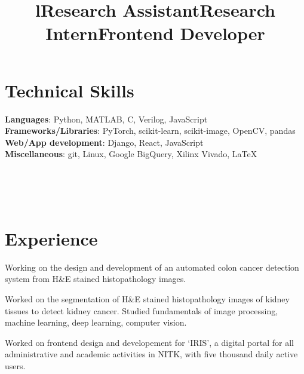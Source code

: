 \documentclass[margin]{res}
\begin{document}
\begin{resume}
    \section{Technical Skills}
      \textbf{Languages}: Python, MATLAB, C, Verilog, JavaScript
      \\
      \textbf{Frameworks/Libraries}: PyTorch, scikit-learn, scikit-image, OpenCV, pandas
      \\
      \textbf{Web/App development}: Django, React, JavaScript
      \\
      \textbf{Miscellaneous}: git, Linux, Google BigQuery, Xilinx Vivado, \LaTeX


    \begin{format}
      \title{l}\\
      \\
      \body\\
    \end{format}

    \section{Experience}
      \title{\textbf{Research Assistant}}
      \begin{position}
        Working on the design and development of an automated colon cancer detection system from H\&E stained histopathology images.
      \end{position}

      \title{\textbf{Research Intern}}
      \begin{position}
        Worked on the segmentation of H\&E stained histopathology images of kidney tissues to detect kidney cancer. Studied fundamentals of image processing, machine learning, deep learning, computer vision.
      \end{position}

      \title{\textbf{Frontend Developer}}
      \begin{position}
        Worked on frontend design and developement for `IRIS', a digital portal for all administrative and academic activities in NITK, with five thousand daily active users.
      \end{position}


\end{resume}
\end{document}
